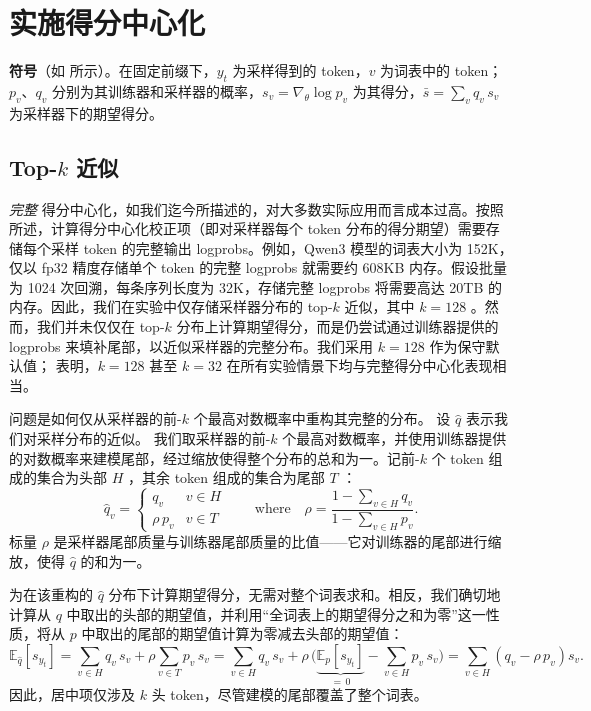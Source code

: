 
\section{实施得分中心化}
\label{sec:sc_implementation}

\begin{notationbox}
\textbf{符号}（如  所示）。在固定前缀下，$y_t$ 为采样得到的 token，$v$ 为词表中的 token；$p_v$、$q_v$ 分别为其训练器和采样器的概率，$s_v = \nabla_\theta \log p_v$ 为其得分，$\bar{s} = \sum_v q_v \, s_v$ 为采样器下的期望得分。
\end{notationbox}

\subsection{Top-$k$ 近似}

\textit{完整} 得分中心化，如我们迄今所描述的，对大多数实际应用而言成本过高。按照  所述，计算得分中心化校正项（即对采样器每个 token 分布的得分期望）需要存储每个采样 token 的完整输出 logprobs。例如，Qwen3 模型的词表大小为 152K，仅以 fp32 精度存储单个 token 的完整 logprobs 就需要约 608KB 内存。假设批量为 1024 次回溯，每条序列长度为 32K，存储完整 logprobs 将需要高达 20TB 的内存。因此，我们在实验中仅存储采样器分布的 top-$k$ 近似，其中 $k=128$ 。然而，我们并未仅仅在 top-$k$ 分布上计算期望得分，而是仍尝试通过训练器提供的 logprobs 来填补尾部，以近似采样器的完整分布。我们采用 $k=128$ 作为保守默认值； 表明，$k=128$ 甚至 $k=32$ 在所有实验情景下均与完整得分中心化表现相当。

问题是如何仅从采样器的前-$k$ 个最高对数概率中重构其完整的分布。  
设 $\hat{q}$  表示我们对采样分布的近似。  
我们取采样器的前-$k$ 个最高对数概率，并使用训练器提供的对数概率来建模尾部，经过缩放使得整个分布的总和为一。记前-$k$ 个 token 组成的集合为头部 $H$ ，其余 token 组成的集合为尾部 $T$ ：
\begin{equation}
\hat{q}_v =
\begin{cases}
q_v & v \in H \\[2pt]
\rho \, p_v & v \in T
\end{cases}
\qquad \textrm{where} \quad
\rho = \frac{1 - \sum_{v \in H} q_v}{1 - \sum_{v \in H} p_v}.
\label{eq:tail_model}
\end{equation}
标量 $\rho$  是采样器尾部质量与训练器尾部质量的比值——它对训练器的尾部进行缩放，使得 $\hat{q}$  的和为一。

为在该重构的 $\hat{q}$ 分布下计算期望得分，无需对整个词表求和。相反，我们确切地计算从 $q$ 中取出的头部的期望值，并利用“全词表上的期望得分之和为零”这一性质，将从 $p$ 中取出的尾部的期望值计算为零减去头部的期望值：
\begin{equation}
\mathbb{E}_{\hat{q}}[s_{y_t}]
= \sum_{v \in H} q_v \, s_v + \rho \sum_{v \in T} p_v \, s_v
= \sum_{v \in H} q_v \, s_v + \rho \, \Big( \underbrace{\mathbb{E}_p[s_{y_t}]}_{=\,0} - \sum_{v \in H} p_v \, s_v \Big)
= \sum_{v \in H} \left( q_v - \rho \, p_v \right) s_v.
\label{eq:sc_topk}
\end{equation}
因此，居中项仅涉及 $k$ 头 token，尽管建模的尾部覆盖了整个词表。

